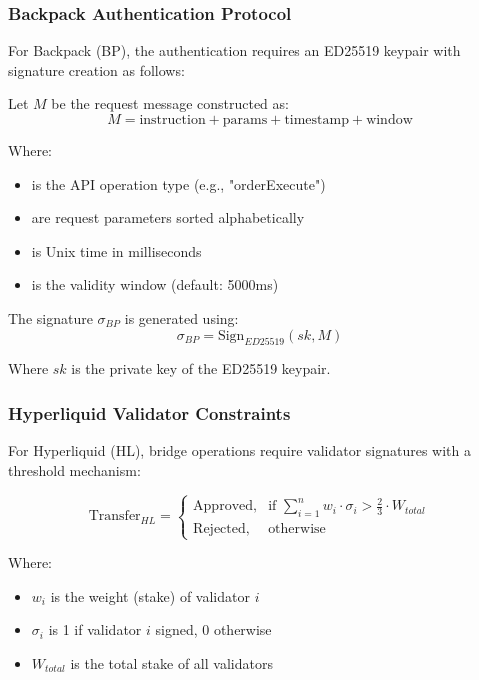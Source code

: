 \documentclass{article}
\begin{document}
\subsubsection{Backpack Authentication Protocol}

For Backpack (BP), the authentication requires an ED25519 keypair with signature creation as follows:

Let $M$ be the request message constructed as:
\begin{equation}
M = \text{instruction} + \text{params} + \text{timestamp} + \text{window}
\end{equation}

Where:
\begin{itemize}
    \item {} is the API operation type (e.g., "orderExecute")
    \item {} are request parameters sorted alphabetically
    \item {} is Unix time in milliseconds 
    \item {} is the validity window (default: 5000ms)
\end{itemize}

The signature $\sigma_{BP}$ is generated using:
\begin{equation}
\sigma_{BP} = \text{Sign}_{ED25519}(sk, M)
\end{equation}

Where $sk$ is the private key of the ED25519 keypair.

\subsubsection{Hyperliquid Validator Constraints}

For Hyperliquid (HL), bridge operations require validator signatures with a threshold mechanism:

\begin{equation}
\text{Transfer}_{HL} = \begin{cases}
\text{Approved}, & \text{if } \sum_{i=1}^{n} w_i \cdot \sigma_i > \frac{2}{3} \cdot W_{total} \\
\text{Rejected}, & \text{otherwise}
\end{cases}
\end{equation}

Where:
\begin{itemize}
    \item $w_i$ is the weight (stake) of validator $i$
    \item $\sigma_i$ is 1 if validator $i$ signed, 0 otherwise
    \item $W_{total}$ is the total stake of all validators
\end{itemize}
\end{document}
